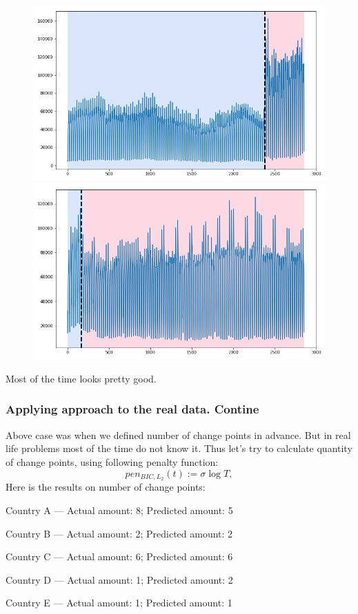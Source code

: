 \documentclass[intlimits, 9pt, unicode]{beamer}
\begin{document}
\begin{frame}
\begin{figure}
	\includegraphics[scale=0.10]{images/036_country_d_cp}
	\includegraphics[scale=0.10]{images/037_country_e_cp}
\end{figure}

Most of the time looks pretty good.
\end{frame}

\begin{frame}
    \frametitle{Applying approach to the real data. Contine}
	
	Above case was when we defined number of change points in advance. But in real life problems most of the time do not know it.
	Thus let's try to calculate quantity of change points, using following penalty function:
	$$ pen_{BIC, L_2}(t) := \sigma \log{T}, $$
	Here is the results on number of change points:
	
	Country A --- Actual amount: 8; Predicted amount: 5 
	
	Country B  --- Actual amount: 2; Predicted amount: 2 
	
	Country C --- Actual amount: 6; Predicted amount: 6 

	Country D --- Actual amount: 1; Predicted amount: 2 
	
	Country E --- Actual amount: 1; Predicted amount: 1 
	
\end{frame}
\end{document}
